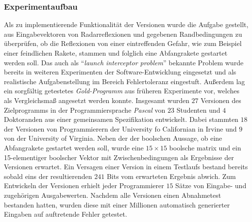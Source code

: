 {\subsubsection{Experimentaufbau}\label{knight-aufbau}
Als zu implementierende Funktionalität der Versionen wurde die Aufgabe gestellt, aus Eingabevektoren von Radarreflexionen und gegebenen Randbedingungen zu überprüfen, ob die Reflexionen von einer eintreffenden Gefahr, wie zum Beispiel einer feindlichen Rakete, stammen und folglich eine Abfangrakete gestartet werden soll. Das auch als \enquote{\emph{launch interceptor problem}} bekannte Problem wurde bereits in weiteren Experimenten der Software-Entwicklung eingesetzt und als realistische Aufgabenstellung im Bereich Fehlertoleranz eingestuft. Außerdem lag ein sorgfältig getestetes \emph{Gold-Programm} aus früheren Experimente vor, welches als Vergleichsmaß angesetzt werden konnte.
Insgesamt wurden $27$ Versionen des Zielprogramms in der Programmiersprache \emph{Pascal} von $23$ Studenten und $4$ Doktoranden aus einer gemeinsamen Spezifikation entwickelt.
Dabei stammten $18$ der Versionen von Programmierern der University fo Californian in Irvine und $9$ von der University of Virginia.
Neben der der boolschen Aussage, ob eine Abfangrakete gestartet werden soll, wurde eine $15 \times 15$ boolsche matrix und ein 15-elementiger boolscher Vektor mit Zwischenbedingungen als Ergebnisse der Versionen erwartet. Ein Versagen einer Version in einem Testlaufs bestand bereits sobald eins der resultierenden $241$ Bits vom erwarteten Ergebnis abwich. Zum Entwickeln der Versionen erhielt jeder Programmierer $15$ Sätze von Eingabe- und zugehörigen Ausgabewerten.
Nachdem alle Versionen einen Abnahmetest bestanden hatten, wurden diese mit einer Millionen automatisch generierter Eingaben auf auftretende Fehler getestet.
%
}
